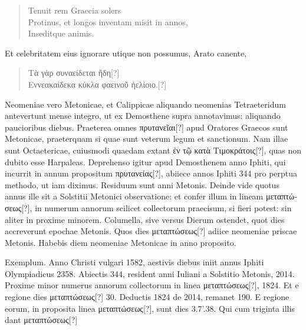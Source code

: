 \begin{verse}
\emd{} Tenuit rem Graecia solers\\
Protinus, et longos inventam misit in annos,\\
Inseditque animis.
\end{verse}
Et celebritatem eius ignorare utique non possumus, Arato canente,
\begin{verse}
\emd{} \textgreek{Τὰ γὰρ συναείδεται ἤδη[?]}\\
\textgreek{Εννεακαίδεκα κύκλα φαεινοῦ ἠελίοιο.[?]}
\end{verse}
Neomeniae vero Metonicae, et Calippicae aliquando neomenias Tetraeteridum
antevertunt mense integro, ut ex Demosthene supra annotavimus:
aliquando paucioribus diebus.
Praeterea omnes \textgreek{πρυτανεῖαι[?]}
apud Oratores Graecos sunt Metonicae, praeterquam si quae sunt veterum
legum et sanctionum.
Nam illae sunt Octaetericae, cuiusmodi
quaedam extant \textgreek{ἐν τῷ κατὰ Τιμοκράτοις[?]},
 quas non dubito esse Harpaleas.
Deprehenso igitur apud Demosthenem anno Iphiti, qui incurrit in
annum propositum \textgreek{πρυτανείας[?]}, abiiece annos Iphiti 344 pro perptua
methodo, ut iam diximus.
Residuum sunt anni Metonis.
Deinde
vide quotus annus ille sit a Solstitii Metonici
observatione: et confer illum in lineam
\textgreek{μεταπτώσεως[?]}, in numerum annorum scilicet collectorum
praecisum, si fieri potest: sin aliter in proxime
minorem.
Columella, sive versus Dierum
ostendet, quot dies accreverunt epochae Metonis.
Quos dies \textgreek{μεταπτώσεως[?]} adiice neomeniae priscae
Metonis.
Habebis diem neomeniae Metonicae
in anno proposito.
\begin{table}[htb]
 
\end{table}
%
Exemplum.
Anno Christi
vulgari 1582, aestivis diebus iniit annus Iphiti
Olympiadicus 2358.
Abiectis 344, resident anni
Iuliani a Solstitio Metonis, 2014.
Proxime minor
numerus annorum collectorum in linea \textgreek{μεταπτώσεως[?]},
1824.
Et e regione dies \textgreek{μεταπτώσεως[?]} 30.
Deductis 1824 de 2014, remanet 190.
E regione
eorum, in proposita linea \textgreek{μεταπτώσεως[?]}, sunt dies
3.7'.38.
Qui cum triginta illis dant \textgreek{μεταπτώσεως[?]}
